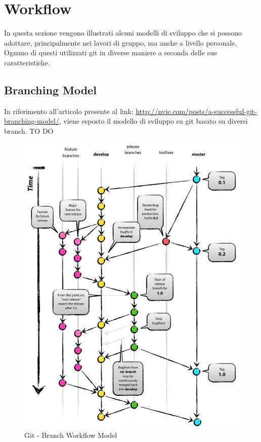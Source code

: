 \newpage \clearpage
\section{Workflow} %
\label{sec:workflow}
In questa sezione vengono illustrati alcuni modelli di sviluppo che si possono adottare, principalmente nei lavori di gruppo, ma anche a livello personale. Ognuno di questi utilizzati git in diverse maniere a seconda delle sue caratteristiche.
	\subsection{Branching Model} %
	\label{sub:branching_model}
	In riferimento all'articolo presente al link: \newline
	\url{http://nvie.com/posts/a-successful-git-branching-model/}, viene esposto il modello di sviluppo su git basato su diversi branch. \newline
	TO DO
	\begin{figure}[htbp]
		\centering
		\includegraphics[scale=0.4]{images/git_branch_workflow.png}
		\caption{Git - Branch Workflow Model}
		\label{fig:git_branch_workflow_model}
	\end{figure}


\newpage \clearpage